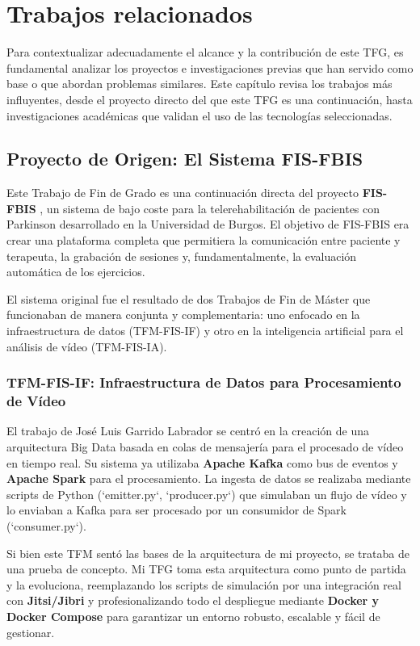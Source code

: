 \chapter{Trabajos relacionados}
\label{chap:trabajos_relacionados}

Para contextualizar adecuadamente el alcance y la contribución de este TFG, es fundamental analizar los proyectos e investigaciones previas que han servido como base o que abordan problemas similares. Este capítulo revisa los trabajos más influyentes, desde el proyecto directo del que este TFG es una continuación, hasta investigaciones académicas que validan el uso de las tecnologías seleccionadas.

\section{Proyecto de Origen: El Sistema FIS-FBIS}
\label{sec:trab_rel_fisfbis}
Este Trabajo de Fin de Grado es una continuación directa del proyecto \textbf{FIS-FBIS} \cite{garrido_fisfbis}, un sistema de bajo coste para la telerehabilitación de pacientes con Parkinson desarrollado en la Universidad de Burgos. El objetivo de FIS-FBIS era crear una plataforma completa que permitiera la comunicación entre paciente y terapeuta, la grabación de sesiones y, fundamentalmente, la evaluación automática de los ejercicios.

El sistema original fue el resultado de dos Trabajos de Fin de Máster que funcionaban de manera conjunta y complementaria: uno enfocado en la infraestructura de datos (TFM-FIS-IF) y otro en la inteligencia artificial para el análisis de vídeo (TFM-FIS-IA).

\subsection{TFM-FIS-IF: Infraestructura de Datos para Procesamiento de Vídeo}
El trabajo de José Luis Garrido Labrador \cite{garrido_tfm_if} se centró en la creación de una arquitectura Big Data basada en colas de mensajería para el procesado de vídeo en tiempo real. Su sistema ya utilizaba \textbf{Apache Kafka} como bus de eventos y \textbf{Apache Spark} para el procesamiento. La ingesta de datos se realizaba mediante scripts de Python (`emitter.py`, `producer.py`) que simulaban un flujo de vídeo y lo enviaban a Kafka para ser procesado por un consumidor de Spark (`consumer.py`).

Si bien este TFM sentó las bases de la arquitectura de mi proyecto, se trataba de una prueba de concepto. Mi TFG toma esta arquitectura como punto de partida y la evoluciona, reemplazando los scripts de simulación por una integración real con \textbf{Jitsi/Jibri} y profesionalizando todo el despliegue mediante \textbf{Docker y Docker Compose} para garantizar un entorno robusto, escalable y fácil de gestionar.

